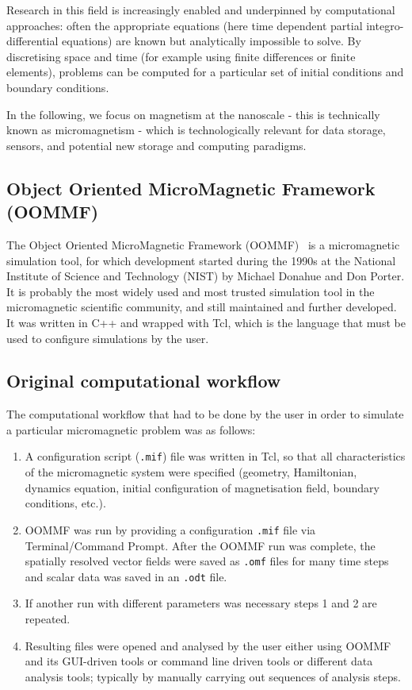 \documentclass{deliverablereport}
\begin{document}
Research in this field is increasingly enabled and underpinned by
computational approaches: often the appropriate equations (here time
dependent partial integro-differential equations) are known but
analytically impossible to solve. By discretising space and time (for
example using finite differences or finite elements), problems can be
computed for a particular set of initial conditions and boundary
conditions.

In the following, we focus on magnetism at the nanoscale -
this is technically known as micromagnetism - which is technologically
relevant for data storage, sensors, and potential new storage and
computing paradigms.



\subsection{Object Oriented MicroMagnetic Framework (OOMMF)}

The Object Oriented MicroMagnetic Framework (OOMMF)~\cite{Donahue1999}
is a micromagnetic simulation tool, for which development started
during the 1990s at the National Institute of Science and Technology
(NIST) by Michael Donahue and Don Porter. It is probably the most
widely used and most trusted simulation tool in the micromagnetic
scientific community, and still maintained and further developed. It
was written in C++ and wrapped with Tcl, which is the language that
must be used to configure simulations by the user.

\subsection{Original computational workflow}

The computational workflow that had to be done by the user in order to simulate a
particular micromagnetic problem was as follows:

\begin{enumerate}
\item A configuration script (\texttt{.mif}) file was written in Tcl,
  so that all characteristics of the micromagnetic system were
  specified (geometry, Hamiltonian, dynamics equation, initial
  configuration of magnetisation field, boundary conditions, etc.).
\item OOMMF was run by providing a configuration \texttt{.mif} file via
  Terminal/Command Prompt. After the OOMMF run was complete, the
  spatially resolved vector fields were saved as \texttt{.omf} files
  for many time steps and scalar data was saved in an \texttt{.odt}
  file.
\item If another run with different parameters was necessary steps 1
  and 2 are repeated.
\item Resulting files were opened and analysed by the user either using
  OOMMF and its GUI-driven tools or command line driven tools or
  different data analysis tools; typically by manually carrying out
  sequences of analysis steps.
\end{enumerate}
\end{document}
